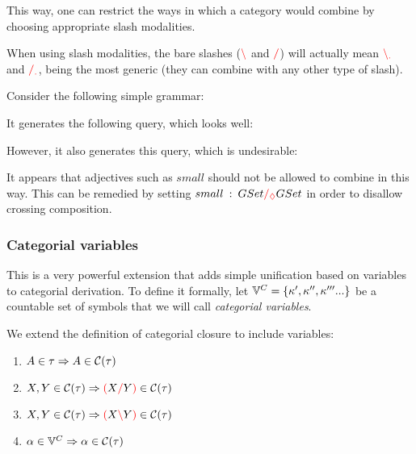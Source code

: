 \documentclass[main.tex]{subfiles}
\begin{document}
This way, one can restrict the ways in which a category would
combine by choosing appropriate slash modalities.

When using slash modalities, the bare slashes ($\textcolor{red}{\backslash}$ and $\textcolor{red}{/}$) will actually
mean $\textcolor{red}{\backslash_{.}}$ and $\textcolor{red}{/_{.}}$, being the most generic (they
can combine with any other type of slash).

\begin{example}
    Consider the following simple grammar:

    It generates the following query, which looks well:

    However, it also generates this query, which is undesirable:

    It appears that adjectives such as $small$ should not be allowed to combine
    in this way. This can be remedied by setting $small \hspace{0.5em} {:} \hspace{0.5em} GSet \textcolor{red}{/_{\lozenge}} GSet$
    in order to disallow crossing composition.
\end{example}

\subsubsection{Categorial variables}
\label{hack:catvars}
This is a very powerful extension that adds simple unification based on variables
to categorial derivation. To define it formally, let $\mathbb{V}^{C} = \{ \kappa', \kappa'', \kappa''' ...\}$
be a countable set of symbols that we will call \emph{categorial variables}.

\begin{defn}
    We extend the definition of categorial closure to include variables:
    \begin{enumerate}
        \item \label{cvar:atomic} $A \in \tau \Rightarrow A \in \mathcal{C}( \tau )$
        \item \label{cvar:right}  $X, Y \in \mathcal{C}( \tau ) \Rightarrow \textcolor{red}{(} X \textcolor{red}{/} Y \textcolor{red}{)} \in \mathcal{C}( \tau )$
        \item \label{cvar:left}   $X, Y \in \mathcal{C}( \tau ) \Rightarrow \textcolor{red}{(} X \textcolor{red}{\backslash} Y \textcolor{red}{)} \in \mathcal{C}( \tau )$
        \item \label{cvar:var}    $\alpha \in \mathbb{V}^{C} \Rightarrow \alpha \in \mathcal{C}( \tau )$
    \end{enumerate}
\end{defn}
\end{document}
